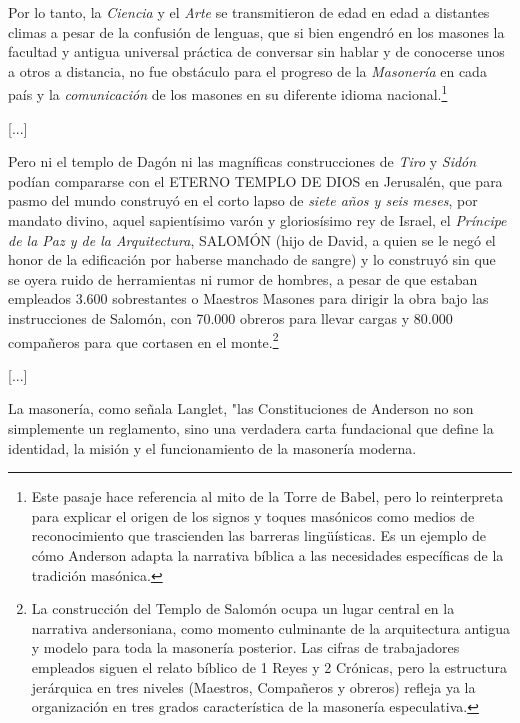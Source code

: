 \documentclass[a4paper,12pt,twoside]{book}
\begin{document}
\noindent Por lo tanto, la \textit{Ciencia} y el \textit{Arte} se transmitieron de edad en edad a distantes climas a pesar de la confusión de lenguas, que si bien engendró en los masones la facultad y antigua universal práctica de conversar sin hablar y de conocerse unos a otros a distancia, no fue obstáculo para el progreso de la \textit{Masonería} en cada país y la \textit{comunicación} de los masones en su diferente idioma nacional.\footnote{Este pasaje hace referencia al mito de la Torre de Babel, pero lo reinterpreta para explicar el origen de los signos y toques masónicos como medios de reconocimiento que trascienden las barreras lingüísticas. Es un ejemplo de cómo Anderson adapta la narrativa bíblica a las necesidades específicas de la tradición masónica.}

\vspace{0.5cm}

[...]
\vspace{0.5cm}

\noindent Pero ni el templo de Dagón ni las magníficas construcciones de \textit{Tiro} y \textit{Sidón} podían compararse con el ETERNO TEMPLO DE DIOS en Jerusalén, que para pasmo del mundo construyó en el corto lapso de \textit{siete años y seis meses}, por mandato divino, aquel sapientísimo varón y gloriosísimo rey de Israel, el \textit{Príncipe de la Paz y de la Arquitectura}, SALOMÓN (hijo de David, a quien se le negó el honor de la edificación por haberse manchado de sangre) y lo construyó sin que se oyera ruido de herramientas ni rumor de hombres, a pesar de que estaban empleados 3.600 sobrestantes o Maestros Masones para dirigir la obra bajo las instrucciones de Salomón, con 70.000 obreros para llevar cargas y 80.000 compañeros para que cortasen en el monte.\footnote{La construcción del Templo de Salomón ocupa un lugar central en la narrativa andersoniana, como momento culminante de la arquitectura antigua y modelo para toda la masonería posterior. Las cifras de trabajadores empleados siguen el relato bíblico de 1 Reyes y 2 Crónicas, pero la estructura jerárquica en tres niveles (Maestros, Compañeros y obreros) refleja ya la organización en tres grados característica de la masonería especulativa.}

\vspace{0.5cm}

[...]
\vspace{0.5cm}

\noindent La masonería, como señala Langlet, "las Constituciones de Anderson no son simplemente un reglamento, sino una verdadera carta fundacional que define la identidad, la misión y el funcionamiento de la masonería moderna.
\end{document}
